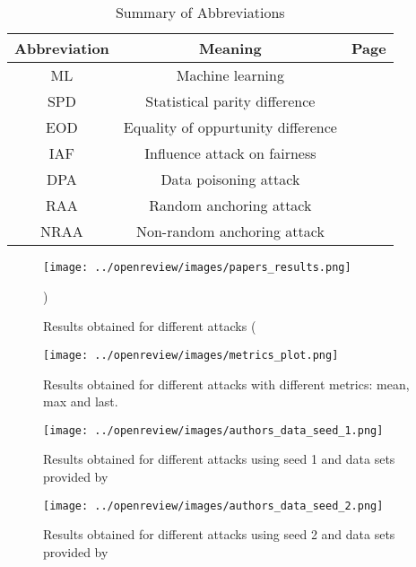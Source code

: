 \begin{table}[h!]
    \centering
    \begin{tabular}{|c|c|c|}
        \hline
        Abbreviation & Meaning & Page \\
        \hline
        ML & Machine learning & \pageref{intro} \\
        SPD & Statistical parity difference & \pageref{sec:claims} \\
        EOD & Equality of oppurtunity difference & \pageref{sec:claims} \\
        IAF & Influence attack on fairness & \pageref{intro} \\
        DPA & Data poisoning attack & \pageref{model description} \\
        RAA & Random anchoring attack & \pageref{model description} \\
        NRAA & Non-random anchoring attack & \pageref{model description} \\
        \hline
    \end{tabular}
    \vspace{0.3cm}
    \caption{Summary of Abbreviations}
    \label{tab:abbreviations}
\end{table}

\begin{figure}[h!]
\texttt{[image: ../openreview/images/papers\_results.png]}
\centering
\caption{Results obtained for different attacks (\cite{mehrabi2020exacerbating}})
\label{papers_results}
\end{figure}

\begin{figure}[h!]
\texttt{[image: ../openreview/images/metrics\_plot.png]}
\centering
\caption{Results obtained for different attacks with different metrics: mean, max and last.}
\label{metrics_plot}
\end{figure}

\begin{figure}[h!]
\texttt{[image: ../openreview/images/authors\_data\_seed\_1.png]}
\centering
\caption{Results obtained for different attacks using seed 1 and data sets provided by \cite{mehrabi2020exacerbating}}
\label{authors_seed1}
\end{figure}

\begin{figure}[h!]
\texttt{[image: ../openreview/images/authors\_data\_seed\_2.png]}
\centering
\caption{Results obtained for different attacks using seed 2 and data sets provided by \cite{mehrabi2020exacerbating}}
\label{authors_seed2}
\end{figure}


